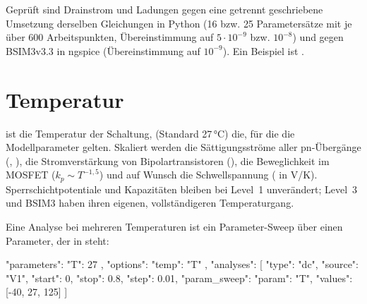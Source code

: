 Geprüft sind Drainstrom und Ladungen gegen eine getrennt geschriebene
Umsetzung derselben Gleichungen in Python (16 bzw. 25 Parametersätze mit je
über 600 Arbeitspunkten, Übereinstimmung auf $5\cdot10^{-9}$ bzw.
$10^{-8}$) und gegen BSIM3v3.3 in ngspice (Übereinstimmung auf
$10^{-9}$). Ein Beispiel ist .

\section{Temperatur}
\label{sec:temperatur}

 ist die Temperatur der Schaltung, 
(Standard 27\,°C) die, für die die Modellparameter gelten. Skaliert werden
die Sättigungsströme aller pn-Übergänge (, ), die
Stromverstärkung von Bipolartransistoren (), die Beweglichkeit im
MOSFET ($k_p \sim T^{-1{,}5}$) und auf Wunsch die Schwellspannung
( in V/K). Sperrschichtpotentiale und Kapazitäten bleiben bei
Level~1 unverändert; Level~3 und BSIM3 haben ihren eigenen, vollständigeren
Temperaturgang.

Eine Analyse bei mehreren Temperaturen ist ein Parameter-Sweep über einen
Parameter, der in  steht:

\begin{json}
"parameters": { "T": 27 },
"options": { "temp": "T" },
"analyses": [ { "type": "dc", "source": "V1", "start": 0, "stop": 0.8, "step": 0.01,
                "param_sweep": { "param": "T", "values": [-40, 27, 125] } } ]
\end{json}
